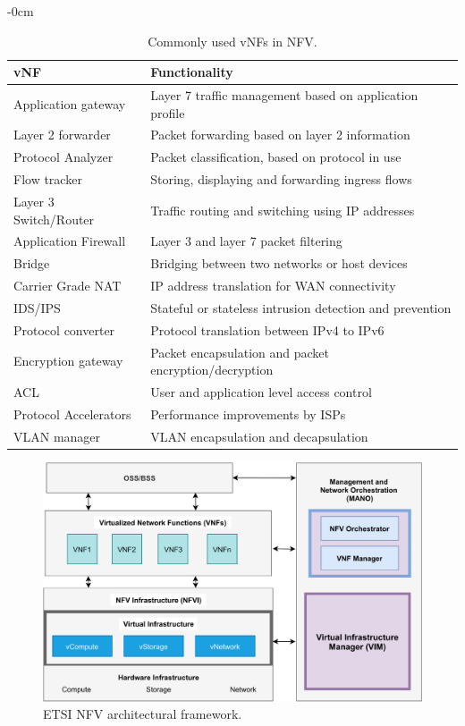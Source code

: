 \documentclass[futureinternet,review,accept,pdftex,moreauthors]{Definitions/mdpi}
\begin{document}
\begin{table}[H]
\tablesize{\small}
\caption{Commonly used vNFs in NFV.\label{VNF-Table}}
	\begin{adjustwidth}{-\extralength}{0cm}
		\begin{tabularx}{\fulllength}{CC}
			\toprule
			\textbf{vNF} & \textbf{Functionality} \\
\midrule
Application gateway & Layer 7 traffic management based on application profile \\ %
Layer 2 forwarder & Packet forwarding based on layer 2 information\\ %
Protocol Analyzer & Packet classification, based on protocol in use \\ %
Flow tracker & Storing, displaying and forwarding ingress flows\\ %
Layer 3 Switch/Router & Traffic routing and switching using IP addresses \\ %
Application Firewall & Layer 3 and layer 7 packet filtering  \\ %
Bridge & Bridging between two networks or host devices \\ %
Carrier Grade NAT & IP address translation for WAN connectivity \\ %
IDS/IPS & Stateful or stateless intrusion detection and prevention \\ %
Protocol converter & Protocol translation between IPv4 to IPv6 \\ %
Encryption gateway & Packet encapsulation and packet encryption/decryption\\ %
ACL & User and application level access control  \\ %
Protocol Accelerators & Performance improvements by ISPs \\ %
VLAN manager & VLAN encapsulation and decapsulation \\
	\bottomrule
		\end{tabularx}
	\end{adjustwidth}
\end{table}
\unskip

\begin{figure}[H]%
\includegraphics[width=0.78\columnwidth]{NFV.pdf}
\caption{ETSI NFV architectural framework.}
\label{NFV}
\end{figure}\vspace{-12pt}
\end{document}
